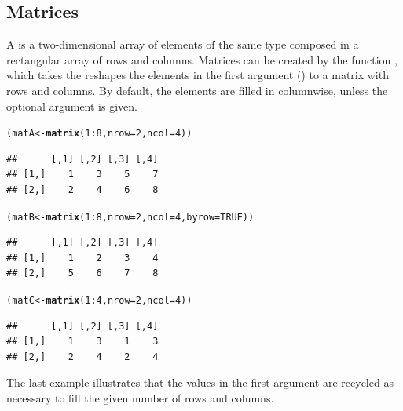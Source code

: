 \documentclass[11pt]{book}\usepackage[]{graphicx}\usepackage[]{color}
\makeatletter
\newcommand{\hlnum}[1]{\textcolor[rgb]{0.686,0.059,0.569}{#1}}%
\newcommand{\hlopt}[1]{\textcolor[rgb]{0,0,0}{#1}}%
\newcommand{\hlstd}[1]{\textcolor[rgb]{0.345,0.345,0.345}{#1}}%
\newcommand{\hlkwb}[1]{\textcolor[rgb]{0.69,0.353,0.396}{#1}}%
\newcommand{\hlkwc}[1]{\textcolor[rgb]{0.333,0.667,0.333}{#1}}%
\newcommand{\hlkwd}[1]{\textcolor[rgb]{0.737,0.353,0.396}{\textbf{#1}}}%
\newenvironment{kframe}{%
 \def\at@end@of@kframe{}%
 \ifinner\ifhmode%
  \def\at@end@of@kframe{\end{minipage}}%
  \begin{minipage}{\columnwidth}%
 \fi\fi%
 \def\FrameCommand##1{\hskip\@totalleftmargin \hskip-\fboxsep
 \colorbox{shadecolor}{##1}\hskip-\fboxsep
     \hskip-\linewidth \hskip-\@totalleftmargin \hskip\columnwidth}%
 \MakeFramed {\advance\hsize-\width
   \@totalleftmargin\z@ \linewidth\hsize
   \@setminipage}}%
 {\par\unskip\endMakeFramed%
 \at@end@of@kframe}
\newenvironment{knitrout}{}{} %
\renewenvironment{knitrout}{\small\renewcommand{\baselinestretch}{.85}}{} %
\makeatother
\begin{document}
\subsection{Matrices}
A  is a two-dimensional array of elements of the same type composed
in a rectangular array of rows and columns. Matrices can be created by the function
, which takes the reshapes the elements in 
the first argument () to a matrix with  rows and
 columns. By default, the elements are filled in columnwise, unless
the optional argument  is given.

\begin{knitrout}
\color{fgcolor}\begin{kframe}
\begin{alltt}
\hlstd{(matA} \hlkwb{<-} \hlkwd{matrix}\hlstd{(}\hlnum{1}\hlopt{:}\hlnum{8}\hlstd{,} \hlkwc{nrow}\hlstd{=}\hlnum{2}\hlstd{,} \hlkwc{ncol}\hlstd{=}\hlnum{4}\hlstd{))}
\end{alltt}
\begin{verbatim}
##      [,1] [,2] [,3] [,4]
## [1,]    1    3    5    7
## [2,]    2    4    6    8
\end{verbatim}
\begin{alltt}
\hlstd{(matB} \hlkwb{<-} \hlkwd{matrix}\hlstd{(}\hlnum{1}\hlopt{:}\hlnum{8}\hlstd{,} \hlkwc{nrow}\hlstd{=}\hlnum{2}\hlstd{,} \hlkwc{ncol}\hlstd{=}\hlnum{4}\hlstd{,} \hlkwc{byrow}\hlstd{=}\hlnum{TRUE}\hlstd{))}
\end{alltt}
\begin{verbatim}
##      [,1] [,2] [,3] [,4]
## [1,]    1    2    3    4
## [2,]    5    6    7    8
\end{verbatim}
\begin{alltt}
\hlstd{(matC} \hlkwb{<-} \hlkwd{matrix}\hlstd{(}\hlnum{1}\hlopt{:}\hlnum{4}\hlstd{,} \hlkwc{nrow}\hlstd{=}\hlnum{2}\hlstd{,} \hlkwc{ncol}\hlstd{=}\hlnum{4}\hlstd{))}
\end{alltt}
\begin{verbatim}
##      [,1] [,2] [,3] [,4]
## [1,]    1    3    1    3
## [2,]    2    4    2    4
\end{verbatim}
\end{kframe}
\end{knitrout}

\noindent The last example illustrates that the values in the first argument are recycled
as necessary to fill the given number of rows and columns.
\end{document}
